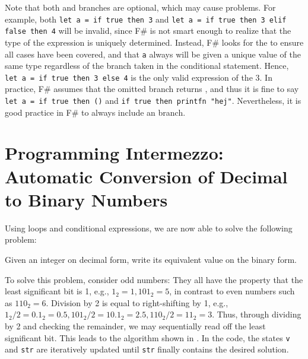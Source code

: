 \documentclass[fsharpnotes.tex]{subfiles}
\begin{document}
Note that both  and  branches are optional, which may cause problems. For example, both \mbox{\lstinline!let a = if true then 3!} and \mbox{\lstinline!let a = if true then 3 elif false then 4!}  will be invalid, since F\# is not smart enough to realize that the type of the expression is uniquely determined. Instead, F\# looks for the  to ensure all cases have been covered, and that \lstinline!a! always will be given a unique value of the same type regardless of the branch taken in the conditional statement. Hence, \mbox{\lstinline!let a = if true then 3 else 4!}  is the only valid expression of the 3. In practice, F\# assumes that the omitted branch returns \lexeme{()}, and thus it is fine to say \mbox{\lstinline!let a = if true then ()!} and \mbox{\lstinline!if true then printfn "hej"!}. Nevertheless, it is good practice in F\# to always include an  branch.

\section{Programming Intermezzo: Automatic Conversion of Decimal to Binary Numbers}
Using loops and conditional expressions, we are now able to solve the following problem:
\begin{problem}
  Given an integer on decimal form, write its equivalent value on the binary form.
\end{problem}
To solve this problem, consider odd numbers: They all have the property that the least significant bit is 1, e.g., $1_2 = 1, 101_2 = 5$, in contrast to even numbers such as $110_2 = 6$. Division by 2 is equal to right-shifting by 1, e.g., $1_2/2 = 0.1_2 = 0.5, 101_2/2 = 10.1_2 = 2.5, 110_2/2 = 11_2 = 3$. Thus, through dividing by 2 and checking the remainder, we may sequentially read off the least significant bit. This leads to the algorithm shown in .
%
%
In the code, the states \lstinline!v! and \lstinline!str! are iteratively updated until \lstinline!str! finally contains the desired solution.
\end{document}
